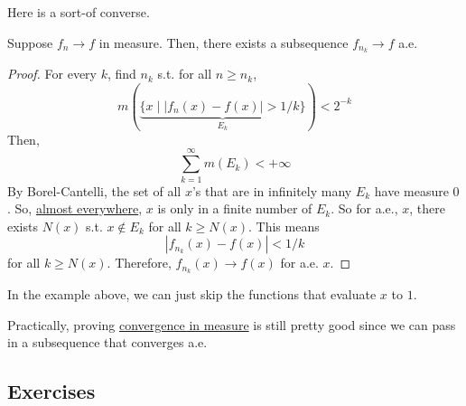   Here is a sort-of converse. 

  \begin{theorem}[Riesz]
		\label{thm:riesz}
    Suppose $f_n \to f$ in measure. Then, there exists a subsequence $f_{n_k} \to f$ a.e. 
  \end{theorem}
  \begin{proof}
    For every $k$, find $n_k$ s.t. for all $n \geq n_k$,
    \begin{equation}
      m(\underbrace{\{x \mid |f_n(x) - f(x)| > 1/k\}}_{E_k}) < 2^{-k}
    \end{equation}
    Then, 
    \begin{equation}
      \sum_{k=1}^\infty m(E_k) < +\infty
    \end{equation}
    By Borel-Cantelli, the set of all $x$'s that are in infinitely many $E_k$ have measure $0$. So, \hyperref[def:almost_everywhere]{almost everywhere}, $x$ is only in a finite number of $E_k$. So for a.e., $x$, there exists $N(x)$ s.t. $x \not\in E_k$ for all $k \geq N(x)$. This means 
    \begin{equation}
      | f_{n_k} (x) - f(x)| < 1/k 
    \end{equation}
    for all $k \geq N(x)$. Therefore, $f_{n_k} (x) \to f(x)$ for a.e. $x$. 
  \end{proof}

  In the example above, we can just skip the functions that evaluate $x$ to $1$. 

  Practically, proving \hyperref[def:convergence-in-measure]{convergence in measure} is still pretty good since we can pass in a subsequence that converges a.e. 

\subsection{Exercises} 

